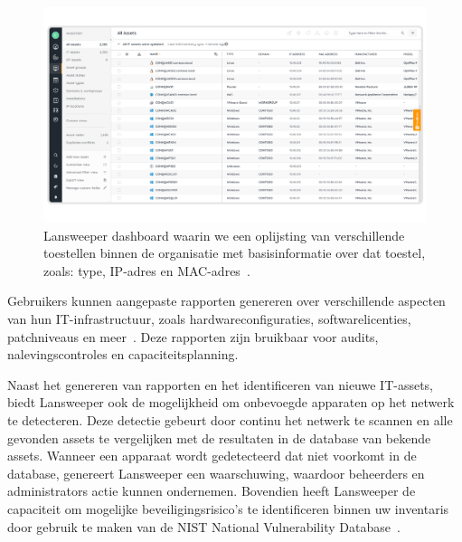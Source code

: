 \begin{figure}[h!]
    \includegraphics[width=\textwidth]
    {./graphics/state-of-the-art/lansweeper-dashboard.png}
    \caption[Lansweeper dashboard met toestelinformatie.]{\label{fig:lansweeper-dashboard}Lansweeper dashboard waarin we een oplijsting van verschillende toestellen binnen de organisatie met basisinformatie over dat toestel, zoals: type, IP-adres en MAC-adres~\autocite{lansweeper-dashboard}.}
\end{figure}

Gebruikers kunnen aangepaste rapporten genereren over verschillende aspecten van hun IT-infrastructuur, zoals hardwareconfiguraties, softwarelicenties, patchniveaus en meer~\autocite{lansweeper-features}.
Deze rapporten zijn bruikbaar voor audits, nalevingscontroles en capaciteitsplanning.

Naast het genereren van rapporten en het identificeren van nieuwe IT-assets, biedt Lansweeper ook de mogelijkheid om onbevoegde apparaten op het netwerk te detecteren.
Deze detectie gebeurt door continu het netwerk te scannen en alle gevonden assets te vergelijken met de resultaten in de database van bekende assets.
Wanneer een apparaat wordt gedetecteerd dat niet voorkomt in de database, genereert Lansweeper een waarschuwing, waardoor beheerders en administrators actie kunnen ondernemen.
Bovendien heeft Lansweeper de capaciteit om mogelijke beveiligingsrisico's te identificeren binnen uw inventaris door gebruik te maken van de NIST National Vulnerability Database~\autocite{lansweeper-cam}.
